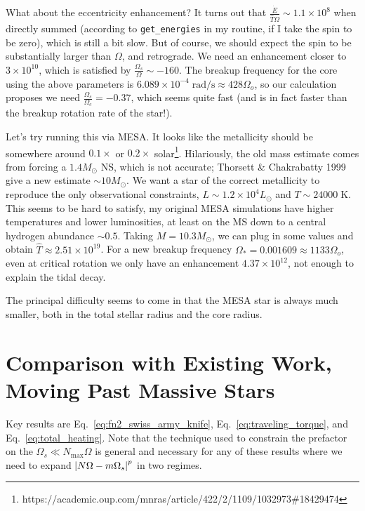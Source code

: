 \documentclass[11pt,
        usenames, %
        dvipsnames %
    ]{article}
\newcommand*{\scinot}[2]{#1\times10^{#2}}
\DeclarePairedDelimiter\abs{\lvert}{\rvert}
\begin{document}
What about the eccentricity enhancement? It turns out that
$\frac{\dot{E}}{\hat{T}\Omega} \sim \scinot{1.1}{8}$ when directly summed
(according to \lstinline{get_energies} in my routine, if I take the spin to be
zero), which is still a bit slow. But of course, we should expect the spin to be
substantially larger than $\Omega$, and retrograde. We need an enhancement
closer to $\scinot{3}{10}$, which is satisfied by $\frac{\Omega_s}{\Omega} \sim
-160$. The breakup frequency for the core using the above parameters is
$\scinot{6.089}{-4}\;\mathrm{rad/s} \approx 428\Omega_o$, so our calculation
proposes we need $\frac{\Omega_s}{\Omega_c} = -0.37$, which seems quite fast
(and is in fact faster than the breakup rotation rate of the star!).

Let's try running this via MESA\@. It looks like the metallicity should be
somewhere around $0.1\times$ or $0.2\times$
solar\footnote{https://academic.oup.com/mnras/article/422/2/1109/1032973\#18429474}.
Hilariously, the old mass estimate comes from forcing a $1.4M_{\odot}$ NS, which
is not accurate; Thorsett \& Chakrabatty 1999 give a new estimate $\sim 10
M_{\odot}$. We want a star of the correct metallicity to reproduce the only
observational constraints, $L \sim \scinot{1.2}{4}L_{\odot}$ and $T \sim
24000\;\mathrm{K}$. This seems to be hard to satisfy, my original MESA
simulations have higher temperatures and lower luminosities, at least on the
MS down to a central hydrogen abundance $\sim 0.5$. Taking $M = 10.3M_{\odot}$,
we can plug in some values and obtain $\hat{T} \approx \scinot{2.51}{19}$. For a
new breakup frequency $\Omega_* = 0.001609 \approx 1133 \Omega_o$, even at
critical rotation we only have an enhancement $\scinot{4.37}{12}$, not enough to
explain the tidal decay.

The principal difficulty seems to come in that the MESA star is always much
smaller, both in the total stellar radius and the core radius.

\section{Comparison with Existing Work, Moving Past Massive Stars}

Key results are Eq.~\eqref{eq:fn2_swiss_army_knife},
Eq.~\eqref{eq:traveling_torque}, and Eq.~\eqref{eq:total_heating}. Note that the
technique used to constrain the prefactor on the $\Omega_s \ll N_{\max}\Omega$
is general and necessary for any of these results where we need to expand
$\abs*{N\Omega - m\Omega_s}^p$ in two regimes.
\end{document}
